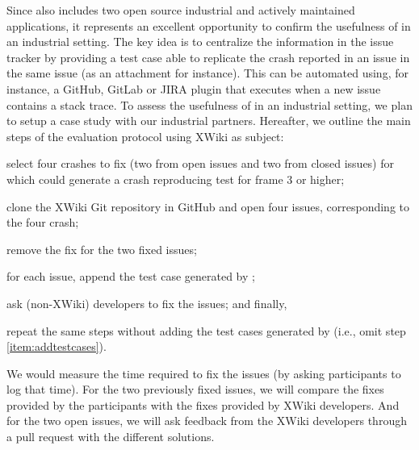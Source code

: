Since \crashpack also includes two open source industrial and actively maintained applications, it represents an excellent opportunity to confirm the usefulness of \evocrash in an industrial setting. 
The key idea is to centralize the information in the issue tracker by providing a test case able to replicate the crash reported in an issue in the same issue (as an attachment for instance).
This can be automated using, for instance, a GitHub, GitLab or JIRA plugin that executes \evocrash when a new issue contains a stack trace.
To assess the usefulness of \evocrash in an industrial setting, we plan to setup a case study \cite{Wohlin2012} with our industrial partners. 
Hereafter, we outline the main steps of the evaluation protocol using XWiki as subject: 
\begin{inparaenum}[(i)]
\item select four crashes to fix (two from open issues and two from closed issues) for which \evocrash could generate a crash reproducing test for frame 3 or higher;
\item clone the XWiki Git repository in GitHub and open four issues, corresponding to the four crash;
\item remove the fix for the two fixed issues;
\item for each issue, append the test case generated by \evocrash; \label{item:addtestcases}
\item ask (non-XWiki) developers to fix the issues;
and finally, \item repeat the same steps without adding the test cases generated by \evocrash (i.e., omit step \ref{item:addtestcases}).
\end{inparaenum}
%
We would measure the time required to fix the issues (by asking participants to log that time). For the two previously fixed issues, we will compare the fixes provided by the participants with the fixes provided by XWiki developers. And for the two open issues, we will ask feedback from the XWiki developers through a pull request with the different solutions. 



